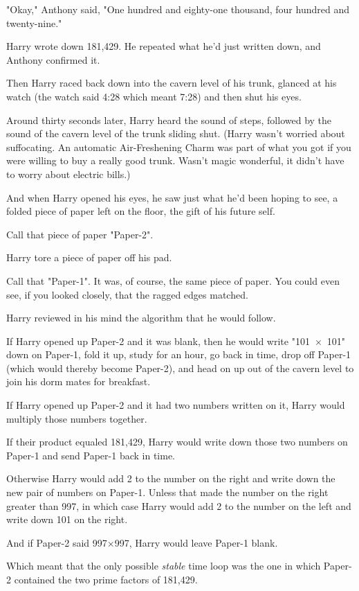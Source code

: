 "Okay," Anthony said, "One hundred and eighty-one thousand, four hundred and
twenty-nine."

Harry wrote down 181,429. He repeated what he'd just written down, and Anthony
confirmed it.

Then Harry raced back down into the cavern level of his trunk, glanced at his
watch (the watch said 4:28 which meant 7:28) and then shut his eyes.

Around thirty seconds later, Harry heard the sound of steps, followed by the
sound of the cavern level of the trunk sliding shut. (Harry wasn't worried
about suffocating. An automatic Air-Freshening Charm was part of what you got
if you were willing to buy a really good trunk. Wasn't magic wonderful, it
didn't have to worry about electric bills.)

And when Harry opened his eyes, he saw just what he'd been hoping to see, a
folded piece of paper left on the floor, the gift of his future self.

Call that piece of paper "Paper-2".

Harry tore a piece of paper off his pad.

Call that "Paper-1". It was, of course, the same piece of paper. You could even
see, if you looked closely, that the ragged edges matched.

Harry reviewed in his mind the algorithm that he would follow.

If Harry opened up Paper-2 and it was blank, then he would write "101~$\times$~101"
down on Paper-1, fold it up, study for an hour, go back in time, drop off
Paper-1 (which would thereby become Paper-2), and head on up out of the cavern
level to join his dorm mates for breakfast.

If Harry opened up Paper-2 and it had two numbers written on it, Harry would
multiply those numbers together.

If their product equaled 181,429, Harry would write down those two numbers on
Paper-1 and send Paper-1 back in time.

Otherwise Harry would add 2 to the number on the right and write down the new
pair of numbers on Paper-1. Unless that made the number on the right greater
than 997, in which case Harry would add 2 to the number on the left and write
down 101 on the right.

And if Paper-2 said 997$\times$997, Harry would leave Paper-1 blank.

Which meant that the only possible \emph{stable} time loop was the one in which
Paper-2 contained the two prime factors of 181,429.

